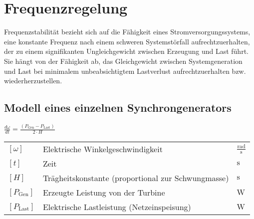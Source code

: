 \section{Frequenzregelung}
Frequenzstabilität bezieht sich auf die Fähigkeit eines Stromversorgungssystems, eine konstante Frequenz nach einem schweren Systemstörfall aufrechtzuerhalten, der zu einem signifikanten Ungleichgewicht zwischen Erzeugung und Last führt. Sie hängt von der Fähigkeit ab, das Gleichgewicht zwischen Systemgeneration und Last bei minimalem unbeabsichtigtem Lastverlust aufrechtzuerhalten bzw. wiederherzustellen.

\subsection{Modell eines einzelnen Synchrongenerators}

$
\boxed{
\frac{d\omega}{dt} = \frac{(P_{\text{Gen}} - P_{\text{Last}})}{2 \cdot H} 
}
$

\vspace{0.15cm}

\renewcommand{\arraystretch}{1.2}
\begin{tabular}{@{} l p{7cm} l @{}}
    $[\omega]$            & Elektrische Winkelgeschwindigkeit \dotfill       & $\frac{\text{rad}}{\text{s}}$ \\
    $[t]$                 & Zeit \dotfill                                    & $\text{s}$ \\
    $[H]$                 & Trägheitskonstante (proportional zur Schwungmasse) \dotfill & $\text{s}$ \\
    $[P_{\text{Gen}}]$    & Erzeugte Leistung von der Turbine \dotfill       & $\text{W}$ \\
    $[P_{\text{Last}}]$   & Elektrische Lastleistung (Netzeinspeisung) \dotfill & $\text{W}$ \\
\end{tabular}



\subsection{}


\subsection{}


\subsection{}


